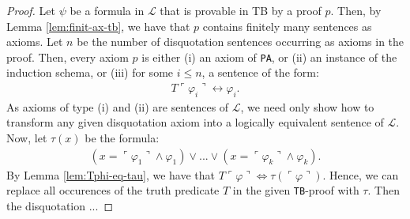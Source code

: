 \begin{proof}  
    Let $\psi$ be a formula in $\mathcal{L}$ that is provable in TB by a proof $p$. Then, by Lemma \ref{lem:finit-ax-tb}, we have that $p$ contains finitely many sentences as axioms. Let $n$ be the number of disquotation sentences occurring as axioms in the proof. Then, every axiom $p$ is either (i) an axiom of \texttt{PA}, or (ii) an instance of the induction schema, or (iii) for some $i \leq n$, a sentence of the form: 
    \begin{align*}
        T\ulcorner \varphi_i \urcorner \leftrightarrow \varphi_i.
    \end{align*}
    As axioms of type (i) and (ii) are sentences of $\mathcal{L}$, we need only show how to transform any given disquotation axiom into a logically equivalent sentence of $\mathcal{L}$. Now, let $\tau(x)$ be the formula: 
    \begin{align*}
        (x = \ulcorner \varphi_1 \urcorner \land \varphi_1) \lor ... \lor (x = \ulcorner \varphi_k \urcorner \land \varphi_k).
    \end{align*}
    By Lemma \ref{lem:Tphi-eq-tau}, we have that $T\ulcorner \varphi \urcorner \iff \tau(\ulcorner \varphi \urcorner)$. Hence, we can replace all occurences of the truth predicate $T$ in the given \texttt{TB}-proof with $\tau$. Then the disquotation ...
\end{proof}
    